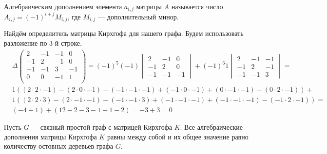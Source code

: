 \begin{definition}
Алгебраическим дополнением элемента $ a_{i,j}$ матрицы $A$ называется число $A_{i,j}=(-1)^{i+j}M_{i,j}$,
где $M_{i,j}$ --- дополнительный минор.
\end{definition}

\begin{example}[Определитель]
Найдём определитель матрицы Кирхгофа для нашего графа. Будем использовать разложение по 3-й строке.
\begin{align*}
&\Delta\left({
  \begin{array}{rrrrrr}
  2  & -1 & -1 & 0  \\
  -1 & 2  & -1 & 0  \\
  -1 & -1 & 3  & -1 \\
  0  & 0  & -1 & 1  \\
  \end{array}
  }\right) = (-1)^5 (-1) {\begin{vmatrix}2&-1&0\\-1&2&0\\-1&-1&-1\end{vmatrix}} + (-1)^6 1 {\begin{vmatrix}2&-1&-1\\-1&2&-1\\-1&-1&3\end{vmatrix}}=\\
  &1((2\cdot2\cdot-1) - (2\cdot0\cdot-1) - (-1\cdot-1\cdot-1) + (-1\cdot0\cdot-1) + (0\cdot-1\cdot-1) - (0\cdot2\cdot-1)) +\\
  & 1((2\cdot2\cdot3) - (2\cdot-1\cdot-1) - (-1\cdot-1\cdot3) + (-1\cdot-1\cdot-1) + (-1\cdot-1\cdot-1) - (-1\cdot2\cdot-1) ) =\\
  & (-4 + 1) + (12 - 2 - 3 - 1 - 1 - 2) = -3 + 3 = 0 
\end{align*}
\end{example}


\begin{theorem}
Пусть $G$ --- связный простой граф с матрицей Кирхгофа $K$. Все алгебраические дополнения матрицы Кирхгофа $K$ равны между собой и их общее значение равно количеству остовных деревьев графа $G$.
\end{theorem}


